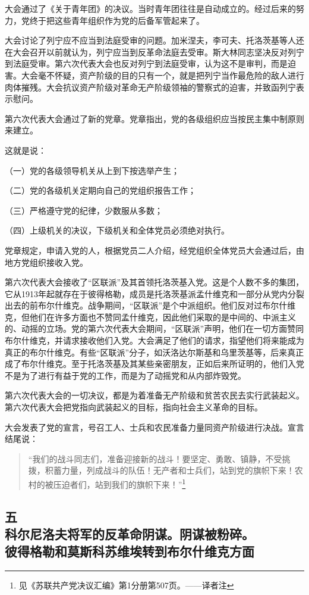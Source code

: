 大会通过了《关于青年团》的决议。当时青年团往往是自动成立的。经过后来的努力，党终于把这些青年组织作为党的后备军管起来了。

大会讨论了列宁应不应当到法庭受审的问题。加米涅夫，李可夫、托洛茨基等人还在大会召开以前就认为，列宁应当到反革命法庭去受审。斯大林同志坚决反对列宁到法庭受审。第六次代表大会也反对列宁到法庭受审，认为这不是审判，而是迫害。大会毫不怀疑，资产阶级的目的只有一个，就是把列宁当作最危险的敌人进行肉体摧残。大会抗议资产阶级对革命无产阶级领袖的警察式的迫害，并致函列宁表示慰问。

第六次代表大会通过了新的党章。党章指出，党的各级组织应当按民主集中制原则来建立。

这就是说：

（一）党的各级领导机关从上到下按选举产生；

（二）党的各级机关定期向自己的党组织报告工作；

（三）严格遵守党的纪律，少数服从多数；

（四）上级机关的决议，下级机关和全体党员必须绝对执行。

党章规定，申请入党的人，根据党员二人介绍，经党组织全体党员大会通过后，由地方党组织接收入党。

第六次代表大会接收了“区联派”及其首领托洛茨基入党。这是个人数不多的集团，它从1913年起就存在于彼得格勒，成员是托洛茨基派孟什维克和一部分从党内分裂出去的前布尔什维克。战争期间，“区联派”是个中派组织。他们反对过布尔什维克，但他们在许多方面也不赞同孟什维克，因此他们采取的是中间的、中派主义的、动摇的立场。党的第六次代表大会期间，“区联派”声明，他们在一切方面赞同布尔什维克，并请求接收他们入党。大会满足了他们的请求，指望他们将来能成为真正的布尔什维克。有些“区联派”分子，如沃洛达尔斯基和乌里茨基等，后来真正成了布尔什维克。至于托洛茨基及其某些亲密朋友，正如后来所证明的，他们入党不是为了进行有益于党的工作，而是为了动摇党和从内部炸毁党。

第六次代表大会的一切决议，都是为着准备无产阶级和贫苦农民去实行武装起义。第六次代表大会把党指向武装起义的目标，指向社会主义革命的目标。

大会发表了党的宣言，号召工人、士兵和农民准备力量同资产阶级进行决战。宣言结尾说：

\begin{quotation}
“我们的战斗同志们，准备迎接新的战斗！要坚定、勇敢、镇静，不受挑拨，积蓄力量，列成战斗的队伍！无产者和士兵们，站到党的旗帜下来！农村的被压迫者们，站到我们的旗帜下来！”\footnote{见《苏联共产党决议汇编》第1分册第507页。——译者注}
\end{quotation}


\subsection[五\q 科尔尼洛夫将军的反革命阴谋。阴谋被粉碎。彼得格勒和莫斯科苏维埃转到布尔什维克方面]{五\\科尔尼洛夫将军的反革命阴谋。阴谋被粉碎。\\彼得格勒和莫斯科苏维埃转到布尔什维克方面}

